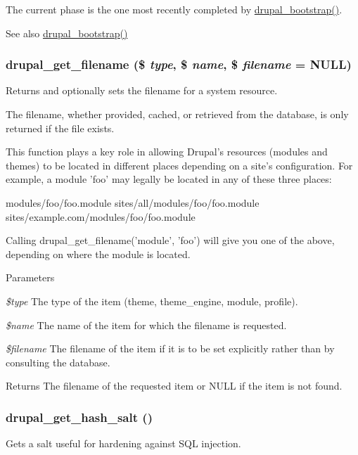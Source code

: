 The current phase is the one most recently completed by \hyperlink{bootstrap_8inc_a8dcad7737ed560086bcdd9998a020a93}{drupal\_\-bootstrap()}.

\begin{DoxySeeAlso}{See also}
\hyperlink{bootstrap_8inc_a8dcad7737ed560086bcdd9998a020a93}{drupal\_\-bootstrap()} 
\end{DoxySeeAlso}
\hypertarget{bootstrap_8inc_ae2af73b6b16cc9d723e931748aa6c853}{
\subsubsection[{drupal\_\-get\_\-filename}]{\setlength{\rightskip}{0pt plus 5cm}drupal\_\-get\_\-filename (\$ {\em type}, \/  \$ {\em name}, \/  \$ {\em filename} = {\ttfamily NULL})}}
\label{bootstrap_8inc_ae2af73b6b16cc9d723e931748aa6c853}
Returns and optionally sets the filename for a system resource.

The filename, whether provided, cached, or retrieved from the database, is only returned if the file exists.

This function plays a key role in allowing Drupal's resources (modules and themes) to be located in different places depending on a site's configuration. For example, a module 'foo' may legally be located in any of these three places:

modules/foo/foo.module sites/all/modules/foo/foo.module sites/example.com/modules/foo/foo.module

Calling drupal\_\-get\_\-filename('module', 'foo') will give you one of the above, depending on where the module is located.


\begin{DoxyParams}{Parameters}
\item[{\em \$type}]The type of the item (theme, theme\_\-engine, module, profile). \item[{\em \$name}]The name of the item for which the filename is requested. \item[{\em \$filename}]The filename of the item if it is to be set explicitly rather than by consulting the database.\end{DoxyParams}
\begin{DoxyReturn}{Returns}
The filename of the requested item or NULL if the item is not found. 
\end{DoxyReturn}
\hypertarget{bootstrap_8inc_a832314334940cc1578689241d665d7e8}{
\subsubsection[{drupal\_\-get\_\-hash\_\-salt}]{\setlength{\rightskip}{0pt plus 5cm}drupal\_\-get\_\-hash\_\-salt ()}}
\label{bootstrap_8inc_a832314334940cc1578689241d665d7e8}
Gets a salt useful for hardening against SQL injection.

